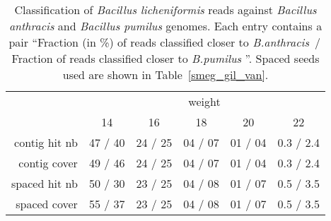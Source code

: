 \begin{table}
\caption{\small Classification of {\em Bacillus licheniformis} reads
  against {\em Bacillus anthracis} and {\em Bacillus pumilus} genomes. Each entry contains a pair ``Fraction (in \%) of reads
  classified closer to {\em B.anthracis}\, /\,Fraction of reads
  classified closer to {\em B.pumilus} ''. Spaced seeds used are
  shown in Table~\ref{smeg_gil_van}.\label{anth_pum_lich}}
\centering
\begin{tabular}{|r|c|c|c|c|c|}
\hline
& \multicolumn{5}{c|}{weight}\\
\cline{2-6}
                        & 14            & 16         & 18        & 20        & 22\\
\hline
  contig hit nb    & 47 / 40 & 24 / 25 & 04 / 07 & 01 / 04 & 0.3 / 2.4\\
  contig cover     & 49 / 46 & 24 / 25 & 04 / 07 & 01 / 04 & 0.3 / 2.4\\
\hline
  spaced hit nb    & 50 / 30 & 23 / 25 & 04 / 08 & 01 / 07 & 0.5 / 3.5\\
  spaced cover    & 55 / 37 & 23 / 25 & 04 / 08 & 01 / 07 & 0.5 / 3.5\\
\hline
\end{tabular}
\end{table}

